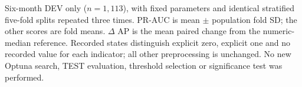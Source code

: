 \begin{table}[ht!]
\centering\small
\caption[Study I race-encoding sensitivity]{Study I race-encoding sensitivity}
\label{tab:review_s1_race_sensitivity}
\setlength{\tabcolsep}{4pt}
\par\smallskip
\begin{minipage}{0.98\linewidth}\footnotesize
Six-month DEV only ($n=1{,}113$), with fixed parameters and identical stratified five-fold splits repeated three times. PR-AUC is mean $\pm$ population fold SD; the other scores are fold means. $\Delta$ AP is the mean paired change from the numeric-median reference. Recorded states distinguish explicit zero, explicit one and no recorded value for each indicator; all other preprocessing is unchanged. No new Optuna search, TEST evaluation, threshold selection or significance test was performed.
\end{minipage}
\end{table}
